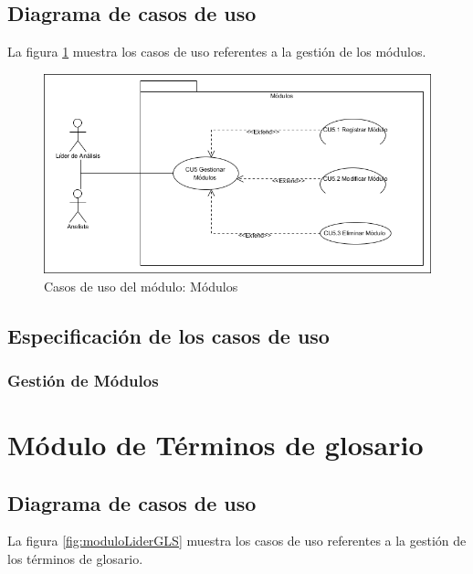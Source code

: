 \subsection{Diagrama de casos de uso}

La figura \ref{fig:moduloLiderM} muestra los casos de uso referentes a la gestión de los módulos.

\begin{figure}[H]
	\begin{center}
		\includegraphics[angle=0,width=.8\textwidth]{images/Diagramas/moduloModulos}
		\caption{Casos de uso del módulo: Módulos}
		\label{fig:moduloLiderM}
	\end{center}
\end{figure}
\newpage

\subsection{Especificación de los casos de uso}
\subsubsection{Gestión de Módulos}


\newpage


\section{Módulo de Términos de glosario}
\subsection{Diagrama de casos de uso}

La figura \ref{fig:moduloLiderGLS} muestra los casos de uso referentes a la gestión de los términos de glosario.

